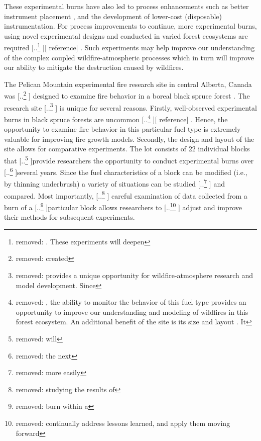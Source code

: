 \documentclass[preprints,article,accept,moreauthors,pdftex]{Definitions/mdpi}
\providecommand{\DIFadd}[1]{{\protect\color{blue} \sf #1}} %
\providecommand{\DIFdel}[1]{{\protect\color{red} [..\footnote{removed: #1} ]}} %
\providecommand{\DIFaddbegin}{} %
\providecommand{\DIFaddend}{} %
\providecommand{\DIFdelbegin}{} %
\providecommand{\DIFdelend}{} %
\begin{document}
These experimental burns have also led to process enhancements such as better instrument placement \cite{kochanski_experimental_2018}, and the development of lower-cost (disposable) instrumentation. For process improvements to continue, more experimental burns, using novel experimental designs and conducted in varied forest ecosystems are required \DIFdelbegin \DIFdel{. These experiments will deepen }\DIFdelend \DIFaddbegin [\DIFadd{reference}]\DIFadd{. Such experiments may help improve }\DIFaddend our understanding of the complex coupled wildfire-atmospheric processes which in turn will improve our ability to mitigate the destruction caused by wildfires.

The Pelican Mountain experimental fire research site in central Alberta, Canada was \DIFdelbegin \DIFdel{created }\DIFdelend \DIFaddbegin \DIFadd{designed }\DIFaddend to examine fire behavior in a boreal black spruce forest \cite{thompson_recent_2020}. The research site \DIFdelbegin \DIFdel{provides a unique opportunity for wildfire-atmosphere research and model development. Since }\DIFdelend \DIFaddbegin \DIFadd{is unique for several reasons. Firstly, }\DIFaddend well-observed experimental burns in black spruce forests are uncommon \DIFdelbegin \DIFdel{, the ability to monitor the behavior of this fuel type provides an opportunity to improve our understanding and modeling of wildfires in this forest ecosystem. An additional benefit of the site is its size and layout . It }\DIFdelend \DIFaddbegin [\DIFadd{reference}]\DIFadd{. Hence, the opportunity to examine fire behavior in this particular fuel type is extremely valuable for improving fire growth models. Secondly, the design and layout of the site allows for comparative experiments. The lot }\DIFaddend consists of 22 individual blocks that  \DIFdelbegin \DIFdel{will }\DIFdelend provide researchers the opportunity to conduct experimental burns over  \DIFdelbegin \DIFdel{the next }\DIFdelend several years. Since the fuel characteristics of a block can be modified (i.e., by thinning underbrush) a variety of situations can be studied \DIFdelbegin \DIFdel{more easily}\DIFdelend \DIFaddbegin \DIFadd{and compared}\DIFaddend . Most importantly, \DIFdelbegin \DIFdel{studying the results of }\DIFdelend \DIFaddbegin \DIFadd{careful examination of data collected from a burn of }\DIFaddend a \DIFdelbegin \DIFdel{burn within a }\DIFdelend particular block allows researchers to  \DIFdelbegin \DIFdel{continually address lessons learned, and apply them moving forward}\DIFdelend \DIFaddbegin \DIFadd{adjust and improve their methods for subsequent experiments}\DIFaddend .
\end{document}
